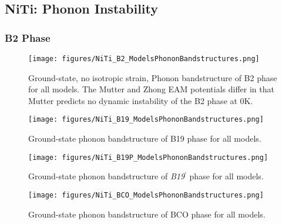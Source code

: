 \documentclass[preprint]{elsarticle}
\begin{document}
\subsection{NiTi: Phonon Instability}
\label{subsec:niphonons}


\subsubsection{B2 Phase}
\label{subsubsec:b2}

\begin{figure}[!htp]
    \begin{centering}
        \texttt{[image: figures/NiTi\_B2\_ModelsPhononBandstructures.png]}
        \caption{
          Ground-state, no isotropic strain, Phonon bandstructure of B2 phase for all models. The Mutter and Zhong EAM potentials differ in that Mutter predicts no dynamic instability of the B2 phase at 0K. 
        }
        \label{fig:allmodels_b2}
    \end{centering}
\end{figure}

\begin{figure}[!htp]
    \begin{centering}
        \texttt{[image: figures/NiTi\_B19\_ModelsPhononBandstructures.png]}
        \caption{
          Ground-state phonon bandstructure of B19 phase for all models.
        }
        \label{fig:allmodels_B19P}
    \end{centering}
\end{figure}

\begin{figure}[!htp]
    \begin{centering}
        \texttt{[image: figures/NiTi\_B19P\_ModelsPhononBandstructures.png]}
        \caption{
          Ground-state phonon bandstructure of \textit{B19}$^\prime$ phase for all models.
        }
        \label{fig:allmodels_B19P}
    \end{centering}
\end{figure}


\begin{figure}[!htp]
    \begin{centering}
        \texttt{[image: figures/NiTi\_BCO\_ModelsPhononBandstructures.png]}
        \caption{
          Ground-state phonon bandstructure of BCO phase for all models.
        }
        \label{fig:allmodels_B19P}
    \end{centering}
\end{figure}
\end{document}
